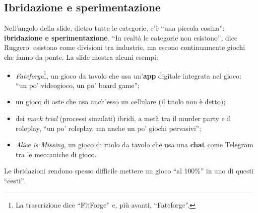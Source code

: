 \subsection{Ibridazione e sperimentazione}

Nell'angolo della slide, dietro tutte le categorie, c'è ``una piccola cosina'':
\textbf{ibridazione e sperimentazione}. ``In realtà le categorie non esistono'',
dice Ruggero: esistono come divisioni tra industrie, ma escono continuamente
giochi che fanno da ponte. La slide mostra alcuni esempi:
\begin{itemize}
  \item \emph{Fateforge}\footnote{La trascrizione dice ``FitForge'' e, più
        avanti, ``Fateforge''.}, un gioco da tavolo che usa un'\textbf{app}
        digitale integrata nel gioco: ``un po' videogioco, un po' board game'';
  \item un gioco di aste che usa anch'esso un cellulare (il titolo non è
        detto);
  \item dei \emph{mock trial} (processi simulati) ibridi, a metà tra il murder
        party e il roleplay, ``un po' roleplay, ma anche un po' giochi
        pervasivi'';
  \item \emph{Alice is Missing}, un gioco di ruolo da tavolo che usa una
        \textbf{chat} come Telegram tra le meccaniche di gioco.
\end{itemize}
Le ibridazioni rendono spesso difficile mettere un gioco ``al 100\%'' in uno di
questi ``cesti''.

